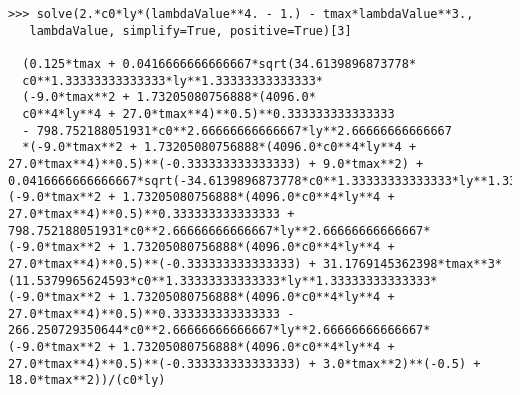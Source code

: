 \begin{lstlisting}[columns=fixed,basicstyle=\ttfamily]
  >>> solve(2.*c0*ly*(lambdaValue**4. - 1.) - tmax*lambdaValue**3.,
   lambdaValue, simplify=True, positive=True)[3]
  
  (0.125*tmax + 0.0416666666666667*sqrt(34.6139896873778*
  c0**1.33333333333333*ly**1.33333333333333*
  (-9.0*tmax**2 + 1.73205080756888*(4096.0*
  c0**4*ly**4 + 27.0*tmax**4)**0.5)**0.333333333333333 
  - 798.752188051931*c0**2.66666666666667*ly**2.66666666666667
  *(-9.0*tmax**2 + 1.73205080756888*(4096.0*c0**4*ly**4 + 27.0*tmax**4)**0.5)**(-0.333333333333333) + 9.0*tmax**2) + 0.0416666666666667*sqrt(-34.6139896873778*c0**1.33333333333333*ly**1.33333333333333*(-9.0*tmax**2 + 1.73205080756888*(4096.0*c0**4*ly**4 + 27.0*tmax**4)**0.5)**0.333333333333333 + 798.752188051931*c0**2.66666666666667*ly**2.66666666666667*(-9.0*tmax**2 + 1.73205080756888*(4096.0*c0**4*ly**4 + 27.0*tmax**4)**0.5)**(-0.333333333333333) + 31.1769145362398*tmax**3*(11.5379965624593*c0**1.33333333333333*ly**1.33333333333333*(-9.0*tmax**2 + 1.73205080756888*(4096.0*c0**4*ly**4 + 27.0*tmax**4)**0.5)**0.333333333333333 - 266.250729350644*c0**2.66666666666667*ly**2.66666666666667*(-9.0*tmax**2 + 1.73205080756888*(4096.0*c0**4*ly**4 + 27.0*tmax**4)**0.5)**(-0.333333333333333) + 3.0*tmax**2)**(-0.5) + 18.0*tmax**2))/(c0*ly)
\end{lstlisting}

